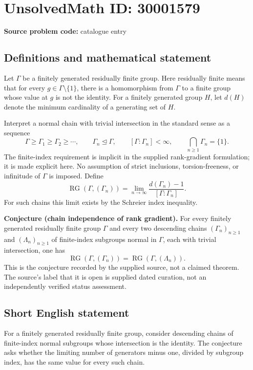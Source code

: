 \documentclass[11pt]{article}
\begin{document}
\section*{UnsolvedMath ID: 30001579}
\textbf{Source problem code:} catalogue entry
\subsection{Definitions and mathematical statement}
Let \(\Gamma\) be a finitely generated residually finite group. Here residually finite means that for every \(g\in\Gamma\setminus\{1\}\), there is a homomorphism from \(\Gamma\) to a finite group whose value at \(g\) is not the identity. For a finitely generated group \(H\), let \(d(H)\) denote the minimum cardinality of a generating set of \(H\).

Interpret a normal chain with trivial intersection in the standard sense as a sequence
\[
\Gamma\geq\Gamma_1\geq\Gamma_2\geq\cdots,
\qquad \Gamma_n\trianglelefteq\Gamma,
\qquad [\Gamma:\Gamma_n]<\infty,
\qquad \bigcap_{n\geq1}\Gamma_n=\{1\}.
\]
The finite-index requirement is implicit in the supplied rank-gradient formulation; it is made explicit here. No assumption of strict inclusions, torsion-freeness, or infinitude of \(\Gamma\) is imposed. Define
\[
\operatorname{RG}(\Gamma,(\Gamma_n))
=\lim_{n\to\infty}\frac{d(\Gamma_n)-1}{[\Gamma:\Gamma_n]}.
\]
For such chains this limit exists by the Schreier index inequality.

\textbf{Conjecture (chain independence of rank gradient).} For every finitely generated residually finite group \(\Gamma\) and every two descending chains \((\Gamma_n)_{n\geq1}\) and \((\Lambda_n)_{n\geq1}\) of finite-index subgroups normal in \(\Gamma\), each with trivial intersection, one has
\[
\operatorname{RG}(\Gamma,(\Gamma_n))
=\operatorname{RG}(\Gamma,(\Lambda_n)).
\]
This is the conjecture recorded by the supplied source, not a claimed theorem. The source's label that it is open is supplied dated curation, not an independently verified status assessment.
\subsection{Short English statement}
For a finitely generated residually finite group, consider descending chains of finite-index normal subgroups whose intersection is the identity. The conjecture asks whether the limiting number of generators minus one, divided by subgroup index, has the same value for every such chain.
\end{document}
